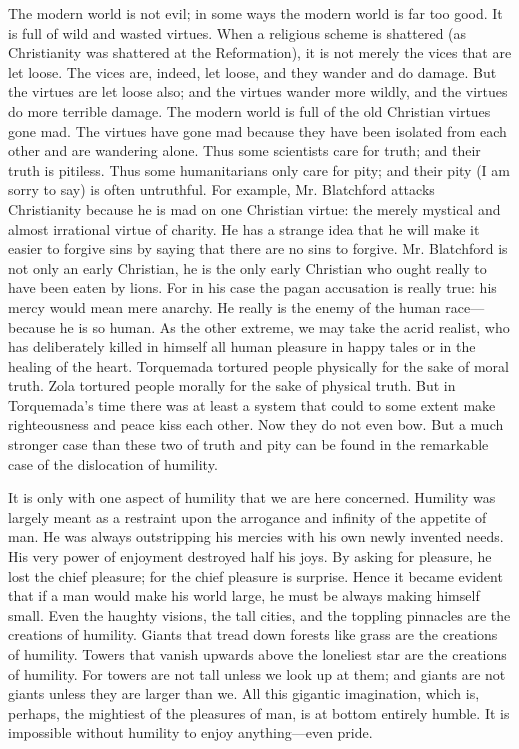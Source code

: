 \documentclass{book}
\begin{document}
The modern world is not evil; in some ways the modern world is far too good. It is full of wild and wasted virtues. When a religious scheme is shattered (as Christianity was shattered at the Reformation), it is not merely the vices that are let loose. The vices are, indeed, let loose, and they wander and do damage. But the virtues are let loose also; and the virtues wander more wildly, and the virtues do more terrible damage. The modern world is full of the old Christian virtues gone mad. The virtues have gone mad because they have been isolated from each other and are wandering alone. Thus some scientists care for truth; and their truth is pitiless. Thus some humanitarians only care for pity; and their pity (I am sorry to say) is often untruthful. For example, Mr. Blatchford attacks Christianity because he is mad on one Christian virtue: the merely mystical and almost irrational virtue of charity. He has a strange idea that he will make it easier to forgive sins by saying that there are no sins to forgive. Mr. Blatchford is not only an early Christian, he is the only early Christian who ought really to have been eaten by lions. For in his case the pagan accusation is really true: his mercy would mean mere anarchy. He really is the enemy of the human race—because he is so human. As the other extreme, we may take the acrid realist, who has deliberately killed in himself all human pleasure in happy tales or in the healing of the heart. Torquemada tortured people physically for the sake of moral truth. Zola tortured people morally for the sake of physical truth. But in Torquemada’s time there was at least a system that could to some extent make righteousness and peace kiss each other. Now they do not even bow. But a much stronger case than these two of truth and pity can be found in the remarkable case of the dislocation of humility.

It is only with one aspect of humility that we are here concerned. Humility was largely meant as a restraint upon the arrogance and infinity of the appetite of man. He was always outstripping his mercies with his own newly invented needs. His very power of enjoyment destroyed half his joys. By asking for pleasure, he lost the chief pleasure; for the chief pleasure is surprise. Hence it became evident that if a man would make his world large, he must be always making himself small. Even the haughty visions, the tall cities, and the toppling pinnacles are the creations of humility. Giants that tread down forests like grass are the creations of humility. Towers that vanish upwards above the loneliest star are the creations of humility. For towers are not tall unless we look up at them; and giants are not giants unless they are larger than we. All this gigantic imagination, which is, perhaps, the mightiest of the pleasures of man, is at bottom entirely humble. It is impossible without humility to enjoy anything—even pride.
\end{document}
